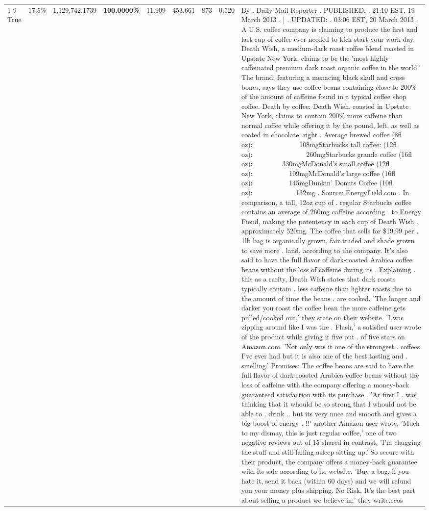 \begin{table}[H]
{\begin{tabular}{lllrlllll}
\cline{1-9}
True & 17.5\% & 1,129,742.1739 & \bfseries \color{red} 100.0000\% & 11.909 & 453.661 & 873 & 0.520 & By . Daily Mail Reporter . PUBLISHED: . 21:10 EST, 19 March 2013 . | . UPDATED: . 03:06 EST, 20 March 2013 . A U.S. coffee company is claiming to produce the first and last cup of coffee ever needed to kick start your work day. Death Wish, a medium-dark roast coffee blend roasted in Upstate New York, claims to be the 'most highly caffeinated premium dark roast organic coffee in the world.' The brand, featuring a menacing black skull and cross bones, says they use coffee beans containing close to 200\% of the amount of caffeine found in a typical coffee shop coffee. Death by coffee: Death Wish, roasted in Upstate New York, claims to contain 200\% more caffeine than normal coffee while offering it by the pound, left, as well as coated in chocolate, right . Average brewed coffee (8fl oz):              108mgStarbucks tall coffee: (12fl oz):                260mgStarbucks grande coffee (16fl oz):         330mgMcDonald's small coffee (12fl oz):           109mgMcDonald's large coffee (16fl oz):           145mgDunkin' Donuts Coffee (10fl oz):             132mg . Source: EnergyField.com . In comparison, a tall, 12oz cup of . regular Starbucks coffee contains an average of 260mg caffeine according . to Energy Fiend, making the potentency in each cup of Death Wish . approximately 520mg. The coffee that sells for \$19.99 per . 1lb bag is organically grown, fair traded and shade grown to save more . land, according to the company. It's also said to have the full flavor of dark-roasted Arabica coffee beans without the loss of caffeine during its . Explaining . this as a rarity, Death Wish states that dark roasts typically contain . less caffeine than lighter roasts due to the amount of time the beans . are cooked. 'The longer and darker you roast the coffee bean the more caffeine gets pulled/cooked out,' they state on their website. 'I was zipping around like I was the . Flash,' a satisfied user wrote of the product while giving it five out . of five stars on Amazon.com. 'Not only was it one of the strongest . coffees I've ever had but it is also one of the best tasting and . smelling.’ Promises: The coffee beans are said to have the full flavor of dark-roasted Arabica coffee beans without the loss of caffeine with the company offering a money-back guaranteed satisfaction with its purchase . 'Ar first I . was thinking that it whould be so strong that I whould not be able to . drink .. but its very nuce and smooth and gives a big boost of energy . !!' another Amazon user wrote. 'Much to my dismay, this is just regular coffee,' one of two negative reviews out of 15 shared in contrast. 'I'm chugging the stuff and still falling asleep sitting up.' So secure with their product, the company offers a money-back guarantee with its sale according to its website. 'Buy a bag, if you hate it, send it back (within 60 days) and we will refund you your money plus shipping. No Risk. It’s the best part about selling a product we believe in,' they write.ecos \\

\end{tabular}}
\end{table}
